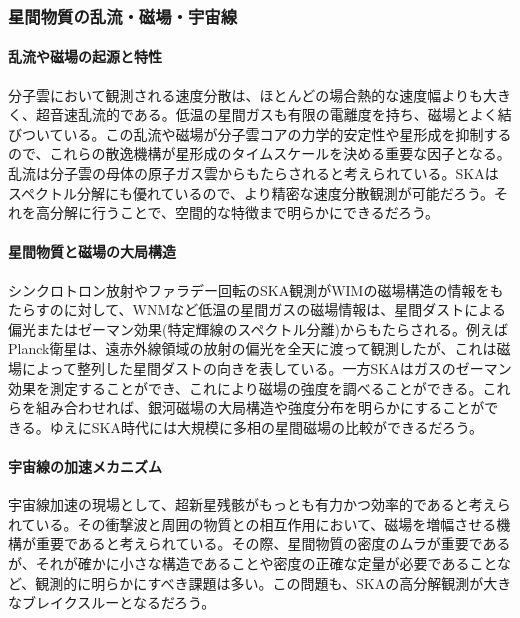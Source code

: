 \subsubsection{星間物質の乱流・磁場・宇宙線}
\label{c08.s1.ss2.sss2}

\paragraph{乱流や磁場の起源と特性}

分子雲において観測される速度分散は、ほとんどの場合熱的な速度幅よりも大きく、超音速乱流的である。低温の星間ガスも有限の電離度を持ち、磁場とよく結びついている。この乱流や磁場が分子雲コアの力学的安定性や星形成を抑制するので、これらの散逸機構が星形成のタイムスケールを決める重要な因子となる。乱流は分子雲の母体の原子ガス雲からもたらされると考えられている。SKAはスペクトル分解にも優れているので、より精密な速度分散観測が可能だろう。それを高分解に行うことで、空間的な特徴まで明らかにできるだろう。

\paragraph{星間物質と磁場の大局構造}

シンクロトロン放射やファラデー回転のSKA観測がWIMの磁場構造の情報をもたらすのに対して、WNMなど低温の星間ガスの磁場情報は、星間ダストによる偏光またはゼーマン効果(特定輝線のスペクトル分離)からもたらされる。例えばPlanck衛星は、遠赤外線領域の放射の偏光を全天に渡って観測したが、これは磁場によって整列した星間ダストの向きを表している。一方SKAはガスのゼーマン効果を測定することができ、これにより磁場の強度を調べることができる。これらを組み合わせれば、銀河磁場の大局構造や強度分布を明らかにすることができる。ゆえにSKA時代には大規模に多相の星間磁場の比較ができるだろう。

\paragraph{宇宙線の加速メカニズム}

宇宙線加速の現場として、超新星残骸がもっとも有力かつ効率的であると考えられている。その衝撃波と周囲の物質との相互作用において、磁場を増幅させる機構が重要であると考えられている。その際、星間物質の密度のムラが重要であるが、それが確かに小さな構造であることや密度の正確な定量が必要であることなど、観測的に明らかにすべき課題は多い。この問題も、SKAの高分解観測が大きなブレイクスルーとなるだろう。


